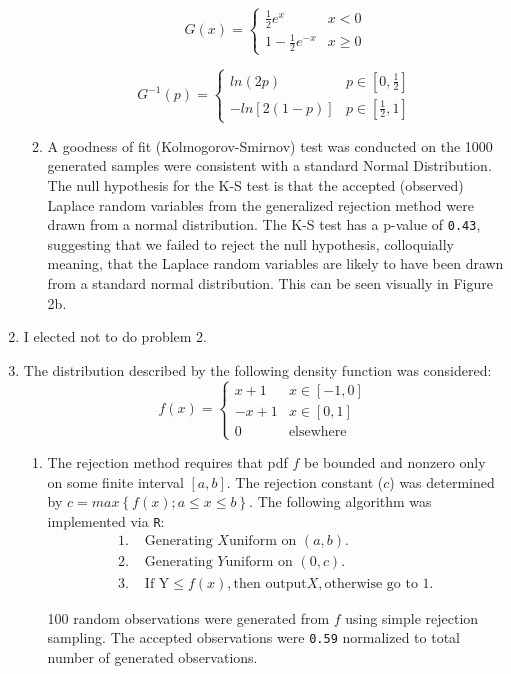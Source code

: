 \documentclass[letterpaper]{article}
\begin{document}
\begin{enumerate}
\begin{enumerate}
$$
G(x) =
\begin{cases}
\frac{1}{2}e^{x} & x < 0\\
1- \frac{1}{2}e^{-x} & x \geq 0
\end{cases}
$$

$$
G^{-1}(p) =
\begin{cases}
ln(2p) & p \in [0, \frac{1}{2}]\\
-ln[2(1-p)] & p \in [\frac{1}{2},1]
\end{cases}
$$


\item A goodness of fit (Kolmogorov-Smirnov) test was conducted on the 1000 generated samples were consistent with a standard Normal Distribution. The null hypothesis for the K-S test is that the accepted (observed) Laplace random variables from the generalized rejection method were drawn from a normal distribution. The K-S test has a p-value of \texttt{0.43}, suggesting that we failed to reject the null hypothesis, colloquially meaning, that the Laplace random variables are likely to have been drawn from a standard normal distribution. This can be seen visually in Figure 2b. 
\end{enumerate}

\item I elected not to do problem 2.
\item The distribution described by the following density function was considered:
$$
f(x) =
\begin{cases}
x+1 & x \in [-1, 0]\\
-x+1 & x \in [0,1]\\
0 & \text{elsewhere}
\end{cases}
$$
\begin{enumerate}
\item The rejection method requires that pdf $f$ be bounded and nonzero only on some finite interval $[a,b]$. The rejection constant ($c$) was determined by $c = max\left\{f(x); a \leq x \leq b \right\}$. The following algorithm was implemented via \texttt{R}: \\

\begin{align*}
\text{1.}&  \text{ Generating } X \text{uniform on } (a,b).\\
\text{2.}& \text{ Generating } Y \text{uniform on } (0,c).\\
\text{3.}& \text{ If Y} \leq f(x), \text{then output} X, \text{otherwise go to } 1.
\end{align*}

100 random observations were generated from $f$ using simple rejection sampling. The accepted observations were \texttt{0.59} normalized to total number of generated observations. 


\end{enumerate}
\end{enumerate}
\end{document}
